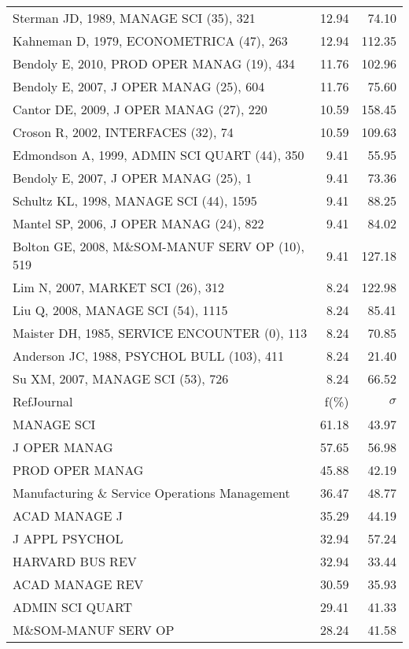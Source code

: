 \documentclass[a4paper,11pt]{report}
\begin{document}
\begin{landscape}
\begin{table}[!ht]
{\begin{tabular}{|l r r|}
Sterman JD, 1989, MANAGE SCI (35), 321 & 12.94 & 74.10\\
Kahneman D, 1979, ECONOMETRICA (47), 263 & 12.94 & 112.35\\
Bendoly E, 2010, PROD OPER MANAG (19), 434 & 11.76 & 102.96\\
Bendoly E, 2007, J OPER MANAG (25), 604 & 11.76 & 75.60\\
Cantor DE, 2009, J OPER MANAG (27), 220 & 10.59 & 158.45\\
Croson R, 2002, INTERFACES (32), 74 & 10.59 & 109.63\\
Edmondson A, 1999, ADMIN SCI QUART (44), 350 & 9.41 & 55.95\\
Bendoly E, 2007, J OPER MANAG (25), 1 & 9.41 & 73.36\\
Schultz KL, 1998, MANAGE SCI (44), 1595 & 9.41 & 88.25\\
Mantel SP, 2006, J OPER MANAG (24), 822 & 9.41 & 84.02\\
Bolton GE, 2008, M\&SOM-MANUF SERV OP (10), 519 & 9.41 & 127.18\\
Lim N, 2007, MARKET SCI (26), 312 & 8.24 & 122.98\\
Liu Q, 2008, MANAGE SCI (54), 1115 & 8.24 & 85.41\\
Maister DH, 1985, SERVICE ENCOUNTER (0), 113 & 8.24 & 70.85\\
Anderson JC, 1988, PSYCHOL BULL (103), 411 & 8.24 & 21.40\\
Su XM, 2007, MANAGE SCI (53), 726 & 8.24 & 66.52\\
\hline
\hline
RefJournal & f(\%) & $\sigma$\\
\hline
MANAGE SCI & 61.18 & 43.97\\
J OPER MANAG & 57.65 & 56.98\\
PROD OPER MANAG & 45.88 & 42.19\\
Manufacturing \& Service Operations Management & 36.47 & 48.77\\
ACAD MANAGE J & 35.29 & 44.19\\
J APPL PSYCHOL & 32.94 & 57.24\\
HARVARD BUS REV & 32.94 & 33.44\\
ACAD MANAGE REV & 30.59 & 35.93\\
ADMIN SCI QUART & 29.41 & 41.33\\
M\&SOM-MANUF SERV OP & 28.24 & 41.58\\
\hline
\end{tabular}
}
\end{table}

\clearpage


\end{landscape}
\end{document}

